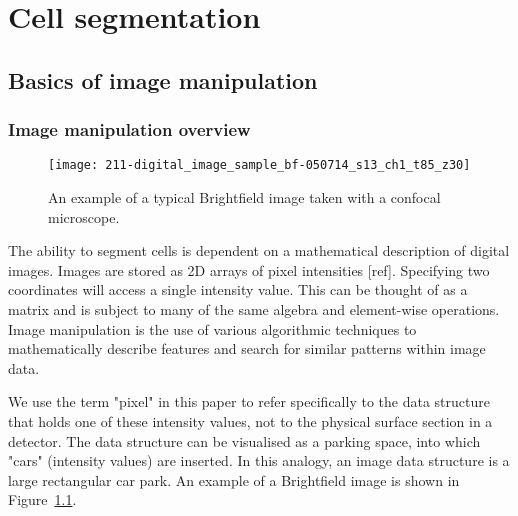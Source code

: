 
\chapter{Cell segmentation}

\ifpdf
    \graphicspath{{Chapter2/Figs/Raster/}{Chapter2/Figs/PDF/}{Chapter2/Figs/}}
\else
    \graphicspath{{Chapter2/Figs/Vector/}{Chapter2/Figs/}}
\fi

\section{Basics of image manipulation}

\subsection{Image manipulation overview}

\begin{figure}[htbp!]
\centering
\texttt{[image: 211-digital\_image\_sample\_bf-050714\_s13\_ch1\_t85\_z30]}
\caption[Brightfield image sample]{An example of a typical Brightfield image taken with a confocal microscope.}
\label{fig:digital_image_sample_bf}
\end{figure}

The ability to segment cells is dependent on a mathematical description of digital images. Images are stored as 2D arrays of pixel intensities [ref]. Specifying two coordinates will access a single intensity value. This can be thought of as a matrix and is subject to many of the same algebra and element-wise operations. Image manipulation is the use of various algorithmic techniques to mathematically describe features and search for similar patterns within image data.

We use the term "pixel" in this paper to refer specifically to the data structure that holds one of these intensity values, not to the physical surface section in a detector. The data structure can be visualised as a parking space, into which "cars" (intensity values) are inserted. In this analogy, an image data structure is a large rectangular car park. An example of a Brightfield image is shown in Figure~\ref{fig:digital_image_sample_bf}.


